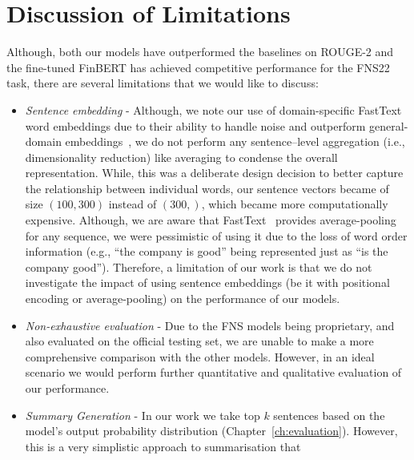 \section{Discussion of Limitations}\label{sec:limitations}
Although, both our models have outperformed the baselines on ROUGE-2 and the fine-tuned FinBERT has achieved competitive
performance for the FNS22 task, there are several limitations that we would like to discuss:
\begin{itemize}
    \item \emph{Sentence embedding} - Although, we note our use of domain-specific FastText word embeddings due to their
    ability to handle noise and outperform general-domain embeddings~\cite{rahimikia2021realised}, we do not perform
    any sentence--level aggregation (i.e., dimensionality reduction) like averaging to condense the overall representation.
    While, this was a deliberate design decision to better capture the relationship between individual words,
    our sentence vectors became of size $(100, 300)$ instead of $(300,)$, which became more computationally expensive.
    Although, we are aware that FastText~\cite{bojanowski-etal-2017-enriching} provides average-pooling for any sequence,
    we were pessimistic of using it due to the loss of word order information (e.g., ``the company is good'' being represented just as ``is the company good'').
    Therefore, a limitation of our work is that we do not investigate the impact of using sentence embeddings
    (be it with positional encoding or average-pooling) on the performance of our models.
    \item \emph{Non-exhaustive evaluation} - Due to the FNS models being proprietary, and also evaluated on the official testing set,
    we are unable to make a more comprehensive comparison with the other models.
    However, in an ideal scenario we would perform further quantitative and qualitative evaluation of our performance.
    \item \emph{Summary Generation} - In our work we take top $k$ sentences based on the model's output probability distribution (Chapter~\ref{ch:evaluation}).
        However, this is a very simplistic approach to summarisation that
\end{itemize}
